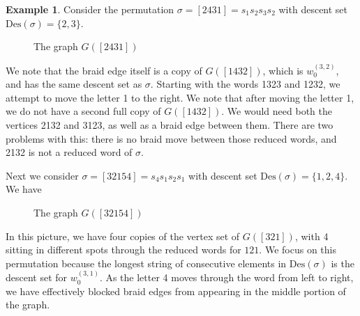 \documentclass[11pt,reqno]{amsart}
\theoremstyle{definition}
\newtheorem{example}[theorem]{Example}
\theoremstyle{notation}
\newcommand{\Des}{\text{Des}}
\begin{document}
\begin{example}\label{blockededges}
Consider the permutation $\sigma = [2431]=s_1s_2s_3s_2$ with descent set $\Des(\sigma) = \{ 2,3\}$.
\begin{figure}[H]
\begin{center}
\vspace{0.1in}
\caption{The graph $G([2431])$}
\label{fig:C4E1}
\end{center}
\end{figure}

We note that the braid edge itself is a copy of $G([1432])$, which is $w_0^{(3,2)}$, and has the same descent set as $\sigma$. Starting with the words 1323 and 1232, we attempt to move the letter 1 to the right. We note that after moving the letter 1, we do not have a second full copy of $G([1432])$. We would need both the vertices 2132 and 3123, as well as a braid edge between them. There are two problems with this: there is no braid move between those reduced words, and 2132 is not a reduced word of $\sigma$.

Next we consider $\sigma = [32154]=s_4s_1s_2s_1$ with descent set $\Des(\sigma) = \{1,2,4 \}$. We have 

\begin{figure}[H]
\begin{center}
\vspace{0.1in}
\caption{The graph $G([32154])$}
\label{fig:C4E0}
\end{center}
\end{figure}

In this picture, we have four copies of the vertex set of $G([321])$, with 4 sitting in different spots through the reduced words for $121$. We focus on this permutation because the longest string of consecutive elements in $\Des(\sigma)$ is the descent set for $w_0^{(3,1)}$. As the letter 4 moves through the word from left to right, we have effectively blocked braid edges from appearing in the middle portion of the graph. 
\end{example}
\end{document}
